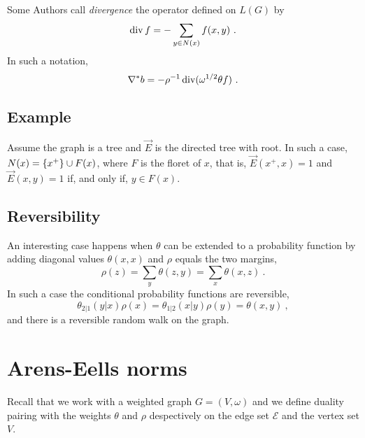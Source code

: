 \documentclass[12pt,a4paper]{amsart}
\begin{document}
Some Authors call \emph{divergence} the operator defined on $L(G)$ by
\begin{equation*}
  \Div f = - \sum_{y \in N(x)} f(x,y) \ .
\end{equation*}
In such a notation,
\begin{equation*}
  \nabla^* b = - \rho^{-1} \operatorname*{div}(\omega^{1/2} \theta f) \ . 
\end{equation*}


\subsection*{Example} Assume the graph is a tree and $\overrightarrow
E$ is the directed tree with root. In such a case, $N(x) = \left\{x^+\right\}
\cup F(x)$, where $F$ is the floret of $x$, that is, $\overrightarrow E(x^+,x) =
1$ and $\overrightarrow E(x,y)=1$ if, and only if, $y \in F(x)$.

\subsection*{Reversibility} An interesting case happens when $\theta$
can be extended to a probability function by adding diagonal values
$\theta(x,x)$ and $\rho$ equals the two margins,
\begin{equation*}
  \rho(z) = \sum_y \theta(z,y) = \sum_x \theta(x,z) \ .
\end{equation*}
In such a case the conditional probability functions are reversible,
\begin{equation*}
  \theta_{2|1}(y|x) \rho(x) = \theta_{1|2}(x|y) \rho(y) = \theta(x,y) \ ,
\end{equation*}
and there is a reversible random walk on the graph.


\section{Arens-Eells norms}

Recall that we work with a weighted graph $G = (V,\omega)$ and we
define duality pairing with the weights $\theta$ and $\rho$
despectively on the edge set $\mathcal E$ and the vertex set $V$.
\end{document}
